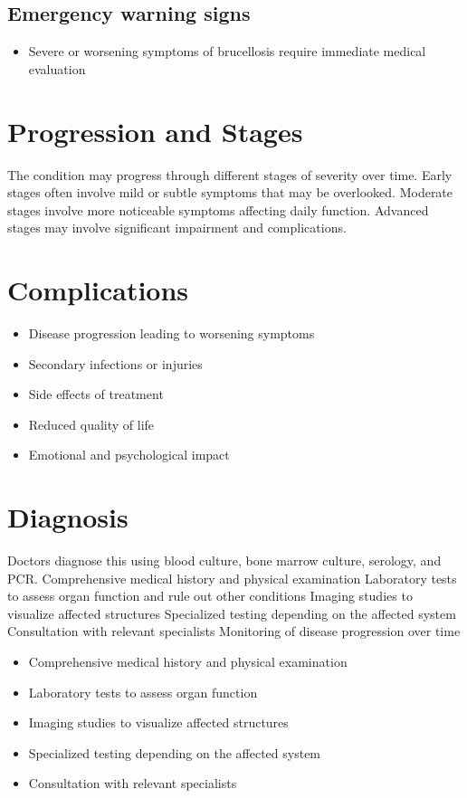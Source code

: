 \subsection{Emergency warning signs}
\begin{itemize}[noitemsep]
  \item Severe or worsening symptoms of brucellosis require immediate medical evaluation
\end{itemize}
\section{Progression and Stages}
The condition may progress through different stages of severity over time. Early stages often involve mild or subtle symptoms that may be overlooked. Moderate stages involve more noticeable symptoms affecting daily function. Advanced stages may involve significant impairment and complications.
\section{Complications}
\begin{itemize}[noitemsep]
  \item Disease progression leading to worsening symptoms
  \item Secondary infections or injuries
  \item Side effects of treatment
  \item Reduced quality of life
  \item Emotional and psychological impact
\end{itemize}
\section{Diagnosis}
Doctors diagnose this using blood culture, bone marrow culture, serology, and PCR. Comprehensive medical history and physical examination Laboratory tests to assess organ function and rule out other conditions Imaging studies to visualize affected structures Specialized testing depending on the affected system Consultation with relevant specialists Monitoring of disease progression over time

\begin{itemize}[noitemsep]
  \item Comprehensive medical history and physical examination
  \item Laboratory tests to assess organ function
  \item Imaging studies to visualize affected structures
  \item Specialized testing depending on the affected system
  \item Consultation with relevant specialists
\end{itemize}
